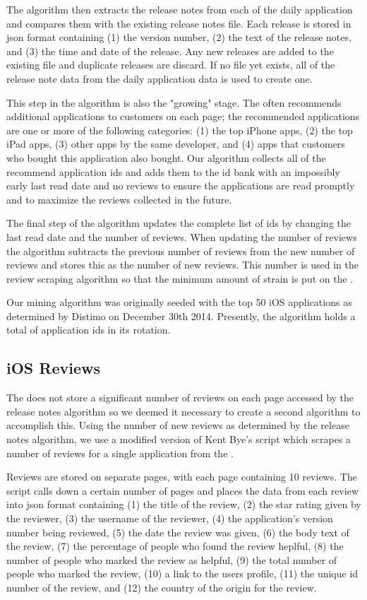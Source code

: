 \documentclass{acm_proc_article-sp}
\begin{document}
The algorithm then extracts the release notes from each of the daily application and compares them with the existing release notes file.
Each release is stored in json format containing (1) the version number, (2) the text of the release notes, and (3) the time and date of the release.
Any new releases are added to the existing file and duplicate releases are discard.
If no file yet exists, all of the release note data from the daily application data is used to create one.


This step in the algorithm is also the "growing" stage.
The \ias often recommends additional applications to customers on each page; the recommended applications are one or more of the following categories: (1) the top iPhone apps, (2) the top iPad apps, (3) other apps by the same developer, and (4) apps that customers who bought this application also bought. 
Our algorithm collects all of the recommend application ids and adds them to the id bank with an impossibly early last read date and no reviews to ensure the applications are read promptly and to maximize the reviews collected in the future.

The final step of the algorithm updates the complete list of ids by changing the last read date and the number of reviews.
When updating the number of reviews the algorithm subtracts the previous number of reviews from the new number of reviews and stores this as the number of new reviews. 
This number is used in the review scraping algorithm so that the minimum amount of strain is put on the \ias.

Our mining algorithm was originally seeded with the top 50 iOS applications as determined by Distimo  on December 30th 2014. 
Presently, the algorithm holds a total of \RNAppsTotal application ids in its rotation.

\subsection{ iOS Reviews}

The \ias does not store a significant number of reviews on each page accessed by the release notes algorithm so we deemed it necessary to create a second algorithm to accomplish this.
Using the number of new reviews as determined by the release notes algorithm, we use a modified version of Kent Bye's script  \cite{} which scrapes a number of reviews for a single application from the \ias.

Reviews are stored on separate pages, with each page containing 10 reviews.
The script calls down a certain number of pages and places the data from each review into json format containing (1) the title of the review, (2) the star rating given by the reviewer, (3) the username of the reviewer, (4) the application's version number being reviewed, (5) the date the review was given, (6) the body text of the review, (7) the percentage of people who found the review heplful, (8) the number of people who marked the review as helpful, (9) the total number of people who marked the review, (10) a link to the users profile, (11) the unique id number of the review, and (12) the country of the origin for the review.
\end{document}
